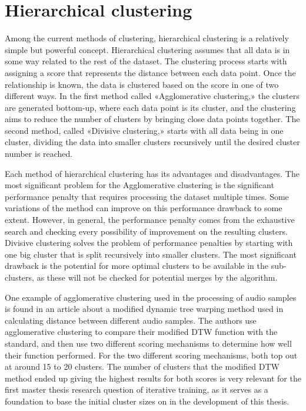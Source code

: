 \section{Hierarchical clustering}



Among the current methods of clustering, hierarchical clustering is a relatively simple but powerful concept. Hierarchical clustering assumes that all data is in some way related to the rest of the dataset. The clustering process starts with assigning a score that represents the distance between each data point. Once the relationship is known, the data is clustered based on the score in one of two different ways. In the first method called «Agglomerative clustering,» the clusters are generated bottom-up, where each data point is its cluster, and the clustering aims to reduce the number of clusters by bringing close data points together. The second method, called «Divisive clustering,» starts with all data being in one cluster, dividing the data into smaller clusters recursively until the desired cluster number is reached.

Each method of hierarchical clustering has its advantages and disadvantages. The most significant problem for the Agglomerative clustering is the significant performance penalty that requires processing the dataset multiple times. Some variations of the method can improve on this performance drawback to some extent. However, in general, the performance penalty comes from the exhaustive search and checking every possibility of improvement on the resulting clusters. Divisive clustering solves the problem of performance penalties by starting with one big cluster that is split recursively into smaller clusters. The most significant drawback is the potential for more optimal clusters to be available in the sub-clusters, as these will not be checked for potential merges by the algorithm.

One example of agglomerative clustering used in the processing of audio samples is found in an article about a modified dynamic tree warping method used in calculating distance between different audio samples\cite{ClusterExample}. The authors use agglomerative clustering to compare their modified DTW function with the standard, and then use two different scoring mechanisms to determine how well their function performed. For the two different scoring mechanisms, both top out at around 15 to 20 clusters. The number of clusters that the modified DTW method ended up giving the highest results for both scores is very relevant for the first master thesis research question of iterative training, as it serves as a foundation to base the initial cluster sizes on in the development of this thesis.


